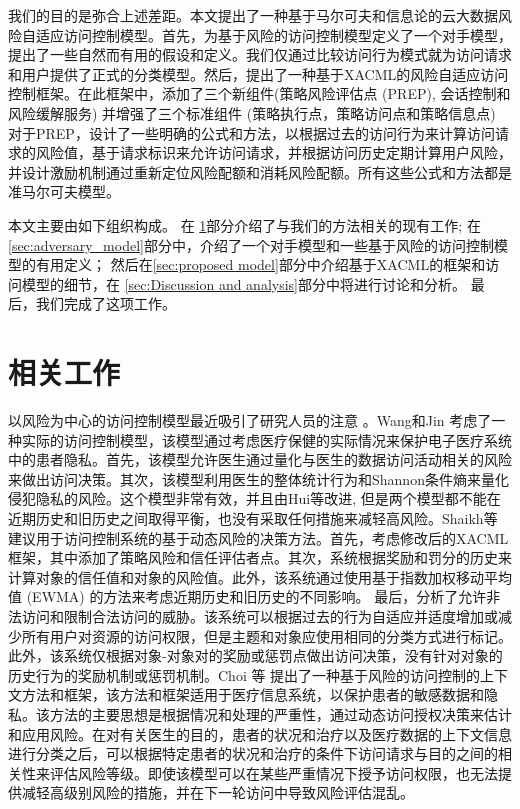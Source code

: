 我们的目的是弥合上述差距。本文提出了一种基于马尔可夫和信息论的云大数据风险自适应访问控制模型。首先，为基于风险的访问控制模型定义了一个对手模型，提出了一些自然而有用的假设和定义。我们仅通过比较访问行为模式就为访问请求和用户提供了正式的分类模型。然后，提出了一种基于XACML的风险自适应访问控制框架。在此框架中，添加了三个新组件(策略风险评估点 (PREP), 会话控制和风险缓解服务) 并增强了三个标准组件 (策略执行点，策略访问点和策略信息点) 对于PREP，设计了一些明确的公式和方法，以根据过去的访问行为来计算访问请求的风险值，基于请求标识来允许访问请求，并根据访问历史定期计算用户风险，并设计激励机制通过重新定位风险配额和消耗风险配额。所有这些公式和方法都是准马尔可夫模型。

本文主要由如下组织构成。 在 \ref{sec:relate}部分介绍了与我们的方法相关的现有工作;  在 \ref{sec:adversary_model}部分中，介绍了一个对手模型和一些基于风险的访问控制模型的有用定义； 然后在\ref{sec:proposed model}部分中介绍基于XACML的框架和访问模型的细节，在 \ref{sec:Discussion and analysis}部分中将进行讨论和分析。 最后，我们完成了这项工作。

\section{相关工作}
\label{sec:relate}
以风险为中心的访问控制模型最近吸引了研究人员的注意 \cite{wang2011quantified,shaikh2012dynamic,choi2015framework}。Wang和Jin\cite{wang2011quantified} 考虑了一种实际的访问控制模型，该模型通过考虑医疗保健的实际情况来保护电子医疗系统中的患者隐私。首先，该模型允许医生通过量化与医生的数据访问活动相关的风险来做出访问决策。其次，该模型利用医生的整体统计行为和Shannon条件熵来量化侵犯隐私的风险。这个模型非常有效，并且由Hui等\cite{hui2015risk}改进, 但是两个模型都不能在近期历史和旧历史之间取得平衡，也没有采取任何措施来减轻高风险。Shaikh等\cite{shaikh2012dynamic} 建议用于访问控制系统的基于动态风险的决策方法。首先，考虑修改后的XACML框架，其中添加了策略风险和信任评估者点。其次，系统根据奖励和罚分的历史来计算对象的信任值和对象的风险值。此外，该系统通过使用基于指数加权移动平均值 (EWMA) 的方法来考虑近期历史和旧历史的不同影响。 最后，分析了允许非法访问和限制合法访问的威胁。该系统可以根据过去的行为自适应并适度增加或减少所有用户对资源的访问权限，但是主题和对象应使用相同的分类方式进行标记。此外，该系统仅根据对象-对象对的奖励或惩罚点做出访问决策，没有针对对象的历史行为的奖励机制或惩罚机制。Choi 等 \cite{choi2015framework}  提出了一种基于风险的访问控制的上下文方法和框架，该方法和框架适用于医疗信息系统，以保护患者的敏感数据和隐私。该方法的主要思想是根据情况和处理的严重性，通过动态访问授权决策来估计和应用风险。在对有关医生的目的，患者的状况和治疗以及医疗数据的上下文信息进行分类之后，可以根据特定患者的状况和治疗的条件下访问请求与目的之间的相关性来评估风险等级。即使该模型可以在某些严重情况下授予访问权限，也无法提供减轻高级别风险的措施，并在下一轮访问中导致风险评估混乱。

